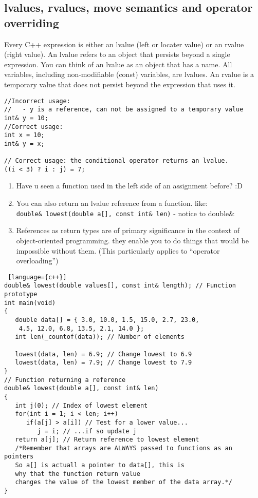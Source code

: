 \subsection{lvalues, rvalues, move semantics and operator overriding}
Every C++ expression is either an lvalue (left or locater value) or an rvalue (right value). An lvalue refers to an object that persists beyond a single expression. You can think of an lvalue as an object that has a name. All variables, including non-modifiable (const) variables, are lvalues. An rvalue is a temporary value that does not persist beyond the expression that uses it. 
\begin{note}
\begin{lstlisting}
//Incorrect usage:
//   - y is a reference, can not be assigned to a temporary value
int& y = 10; 
//Correct usage:
int x = 10;
int& y = x;

// Correct usage: the conditional operator returns an lvalue.
((i < 3) ? i : j) = 7;
\end{lstlisting}
\end{note}
\begin{note}
\begin{enumerate}
\item Have u seen a function used in the left side of an assignment before? :D
\item You can also return an lvalue reference from a function. like: \\ \lstinline[columns=fixed]{double& lowest(double a[], const int& len)} - notice to double\&
\item References as return types are of primary significance in the context of object-oriented programming. they enable you to do things that would be
impossible without them. (This particularly applies to “operator overloading”)
\end{enumerate}
\begin{lstlisting} [language={c++}]
double& lowest(double values[], const int& length); // Function prototype
int main(void)
{
   double data[] = { 3.0, 10.0, 1.5, 15.0, 2.7, 23.0,
	4.5, 12.0, 6.8, 13.5, 2.1, 14.0 };
   int len(_countof(data)); // Number of elements

   lowest(data, len) = 6.9; // Change lowest to 6.9
   lowest(data, len) = 7.9; // Change lowest to 7.9
}
// Function returning a reference
double& lowest(double a[], const int& len)
{
   int j(0); // Index of lowest element
   for(int i = 1; i < len; i++)
      if(a[j] > a[i]) // Test for a lower value...
         j = i; // ...if so update j
   return a[j]; // Return reference to lowest element
   /*Remember that arrays are ALWAYS passed to functions as an pointers
   So a[] is actuall a pointer to data[], this is
   why that the function return value
   changes the value of the lowest member of the data array.*/
}
\end{lstlisting}
\end{note}

